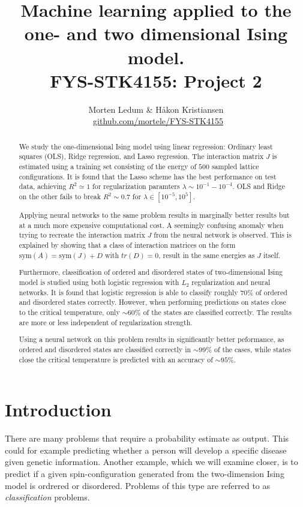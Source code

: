 \documentclass[a4paper, twocolumn]{article}
\title{{\sc Machine learning applied to the one- and two dimensional Ising model. \\ {\large FYS-STK4155: Project 2}}}
\author{Morten Ledum \& Håkon Kristiansen \\ \faGithub \ {\small \href{https://github.com/mortele/FYS-STK4155/tree/master/project2}{github.com/mortele/FYS-STK4155}}}
\begin{document}
\onecolumn
\maketitle

\begin{abstract}
We study the one-dimensional Ising model using linear regression: Ordinary
least squares (OLS), Ridge regression, and Lasso regression. The interaction matrix $J$ is estimated using a training set 
consisting of the energy of $500$ sampled lattice configurations. It is found that the Lasso scheme has the best performance 
on test data, achieving $R^2 \simeq 1$ for regularization paramters $\lambda \sim 10^{-1} - 10^{-4}$. OLS and Ridge on the other fails 
to break $R^2 \sim 0.7$ for $\lambda \in [10^{-5}, 10^{5}]$. 

Applying neural networks to the same problem results in marginally 
better results but at a much more expensive computational cost. A seemingly confusing anomaly when trying to recreate the interaction 
matrix $J$ from the neural network is observed. This is explained by showing that a class of interaction matrices on the 
form $\text{sym}(A) = \text{sym}(J) + D$ with $tr(D) = 0$, result in the same energies as $J$ itself.

Furthermore, classification of ordered and disordered states of two-dimensional Ising model is studied using both 
logistic regression with $L_2$ regularization and neural networks. It is found that logistic regression is able to classify 
roughly $70$\% of ordered and disordered states correctly. However, when performing predictions on states close to the critical 
temperature, only $\sim 60$\% of the states are classified correctly. The results are more or less independent of 
regularization strength. 

Using a neural network on this problem results in significantly better peformance, as ordered and disordered states 
are classified correctly in $\sim 99$\% of the cases, while states close the critical temperature is 
predicted with an accuracy of $\sim 95$\%.
\end{abstract}

\tableofcontents 

\twocolumn


\section{Introduction}
There are many problems that require a probability estimate as output. This could for example predicting whether a person will develop a specific disease given genetic information. Another example, which we will examine closer, is to predict if a given spin-configuration generated from the two-dimension Ising model is ordrered or disordered. Problems of this type are referred to as \textit{classification} problems. 
\end{document}
